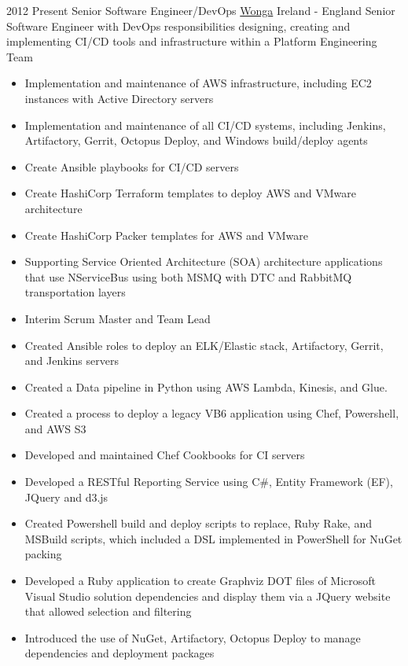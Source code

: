 \documentclass[a4paper]{twentysecondcv} %
\begin{document}
\begin{twenty} %
\twentyitem
    	{2012}%
	{Present} %
    {Senior Software Engineer/DevOps} %
    {\href{https://www.wonga.com/}{Wonga}} %
    {Ireland - England} %
    {Senior Software Engineer with DevOps responsibilities designing, creating and implementing CI/CD tools and infrastructure within a Platform Engineering Team} %
	{\begin{itemize}
		\item Implementation and maintenance of AWS infrastructure, including EC2 instances with Active Directory servers
		\item Implementation and maintenance of all CI/CD systems, including Jenkins, Artifactory, Gerrit, Octopus Deploy, and Windows build/deploy agents
		\item Create Ansible playbooks for CI/CD servers
		\item Create HashiCorp Terraform templates to deploy AWS and VMware architecture
		\item Create HashiCorp Packer templates for AWS and VMware
		\item Supporting Service Oriented Architecture (SOA) architecture applications that use NServiceBus using both MSMQ with DTC and RabbitMQ transportation layers
		\item Interim Scrum Master and Team Lead
	\end{itemize}
	} %
	{\begin{itemize}
		  \item Created Ansible roles to deploy an ELK/Elastic stack, Artifactory, Gerrit, and Jenkins servers
		\item Created a Data pipeline in Python using AWS Lambda, Kinesis, and Glue.
		\item Created a process to deploy a legacy VB6 application using Chef, Powershell, and AWS S3
		\item Developed and maintained Chef Cookbooks for CI servers
		\item Developed a RESTful Reporting Service using C\#, Entity Framework (EF), JQuery and d3.js
		\item Created Powershell build and deploy scripts to replace, Ruby Rake, and MSBuild scripts, which included a DSL implemented in PowerShell for NuGet packing
		\item Developed a Ruby application to create Graphviz DOT files of Microsoft Visual Studio solution dependencies and display them via a JQuery website that allowed selection and filtering
		\item Introduced the use of NuGet, Artifactory, Octopus Deploy to manage dependencies and deployment packages
	\end{itemize}
	} %
\end{twenty}
\end{document}
